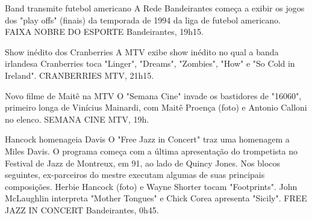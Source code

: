 Band transmite futebol americano 
A Rede Bandeirantes começa a exibir os jogos dos "play offs" (finais) da temporada de 1994 da liga de futebol americano.
FAIXA NOBRE DO ESPORTE  Bandeirantes, 19h15.

Show inédito dos Cranberries 
A MTV exibe show inédito no qual a banda irlandesa Cranberries toca "Linger", "Dreams", "Zombies", "How" e "So Cold in Ireland".
CRANBERRIES  MTV, 21h15.

Novo filme de Maitê na MTV 
O "Semana Cine" invade os bastidores de "16060", primeiro longa de Vinícius Mainardi, com Maitê Proença (foto) e Antonio Calloni no elenco.
SEMANA CINE  MTV, 19h.

Hancock homenageia Davis 
O "Free Jazz in Concert" traz uma homenagem a Miles Davis. O programa começa com a última apresentação do trompetista no Festival de Jazz de Montreux, em 91, ao lado de Quincy Jones. Nos blocos seguintes, ex-parceiros do mestre executam algumas de suas principais composições. Herbie Hancock (foto) e Wayne Shorter tocam "Footprints". John McLaughlin interpreta "Mother Tongues" e Chick Corea apresenta "Sicily".
FREE JAZZ IN CONCERT  Bandeirantes, 0h45.

